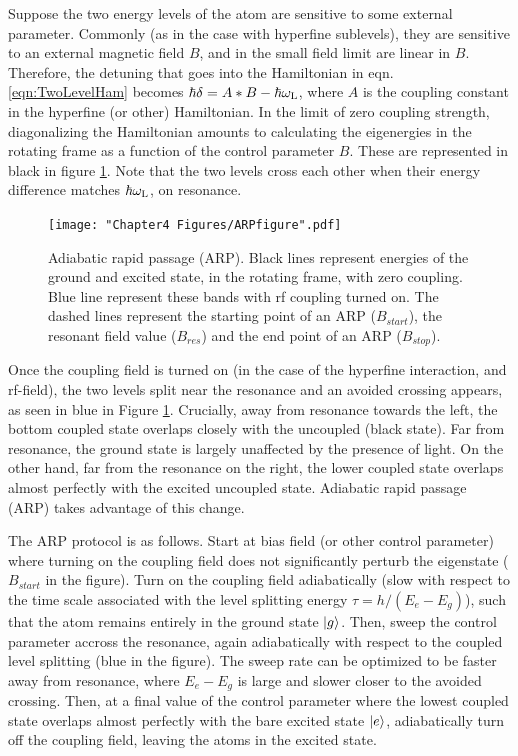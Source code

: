 Suppose the two energy levels of the atom are sensitive to some external parameter. Commonly (as in the case with hyperfine sublevels), they are sensitive to an external magnetic field $B$, and in the small field limit are linear in $B$. Therefore, the detuning that goes into the Hamiltonian in eqn. \ref{eqn:TwoLevelHam} becomes $\hbar\delta = A*B - \hbar\omega_{\rm L}$, where $A$ is the coupling constant in the hyperfine (or other) Hamiltonian.   In the limit of zero coupling strength, diagonalizing the Hamiltonian amounts to calculating the eigenergies in the rotating frame as a function of the control parameter $B$. These are represented in black in figure \ref{fig:ARPfigure}. Note that the two levels cross each other when their energy difference matches $\hbar\omega_{\rm L}$, on resonance.
\begin{figure}
	\texttt{[image: "Chapter4 Figures/ARPfigure".pdf]}
\caption[Adiabatic rapid passage (ARP)]{Adiabatic rapid passage (ARP). Black lines represent energies of the ground and excited state, in the rotating frame, with zero coupling. Blue line represent these bands with rf coupling turned on. The dashed lines represent the starting point of an ARP ($B_{start}$), the resonant field value ($B_{res}$) and the end point of an ARP ($B_{stop}$).}
\label{fig:ARPfigure}
\end{figure}

Once the coupling field is turned on (in the case of the hyperfine interaction, and rf-field), the two levels split near the resonance and an avoided crossing appears, as seen in blue in Figure \ref{fig:ARPfigure}. Crucially, away from resonance towards the left, the bottom coupled state overlaps closely with the uncoupled (black state). Far from resonance, the ground state is largely unaffected by the presence of light. On the other hand, far from the resonance on the right, the lower coupled state overlaps almost perfectly with the excited uncoupled state. Adiabatic rapid passage (ARP) takes advantage of this change.

The ARP protocol is as follows. Start at bias field (or other control parameter) where turning on the coupling field does not significantly perturb the eigenstate ($B_{start}$ in the figure). Turn on the coupling field adiabatically (slow with respect to the time scale associated with the level splitting energy $\tau = h/(E_{e}-E_{g})$), such that the atom remains entirely in the ground state $\mathinner{|{g}\rangle}$. Then, sweep the control parameter accross the resonance, again adiabatically with respect to the coupled level splitting (blue in the figure). The sweep rate can be optimized to be faster away from resonance, where $E_{e}-E_{g}$ is large and slower closer to the avoided crossing. Then, at a final value of the control parameter where the lowest coupled state overlaps almost perfectly with the bare excited state $\mathinner{|{e}\rangle}$, adiabatically turn off the coupling field, leaving the atoms in the excited state. 

